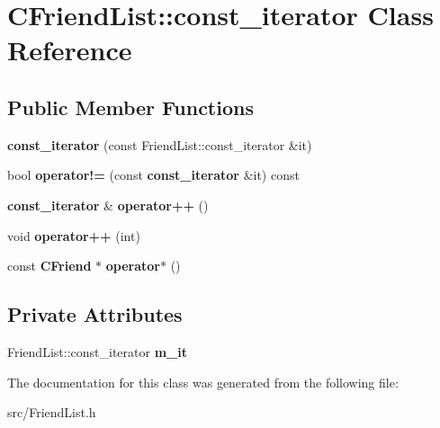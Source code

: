 \section{CFriendList::const\_\-iterator Class Reference}
\label{classCFriendList_1_1const__iterator}
\subsection*{Public Member Functions}
\begin{DoxyCompactItemize}
\item 
{\bfseries const\_\-iterator} (const FriendList::const\_\-iterator \&it)\label{classCFriendList_1_1const__iterator_ad9d2374fee3d303488c6caaace510997}

\item 
bool {\bfseries operator!=} (const {\bf const\_\-iterator} \&it) const \label{classCFriendList_1_1const__iterator_a3e39651dc63460335ffa82fd61a15cac}

\item 
{\bf const\_\-iterator} \& {\bfseries operator++} ()\label{classCFriendList_1_1const__iterator_a1137ceb9f072abf860d051b54b18ce34}

\item 
void {\bfseries operator++} (int)\label{classCFriendList_1_1const__iterator_af11f20ea7d86c2975a99bbc3e060e33f}

\item 
const {\bf CFriend} $\ast$ {\bfseries operator$\ast$} ()\label{classCFriendList_1_1const__iterator_a94c73382eb12e6dcc2eeaa743b4457ac}

\end{DoxyCompactItemize}
\subsection*{Private Attributes}
\begin{DoxyCompactItemize}
\item 
FriendList::const\_\-iterator {\bfseries m\_\-it}\label{classCFriendList_1_1const__iterator_a60ada70a328919cc69636888114e8acc}

\end{DoxyCompactItemize}


The documentation for this class was generated from the following file:\begin{DoxyCompactItemize}
\item 
src/FriendList.h\end{DoxyCompactItemize}
